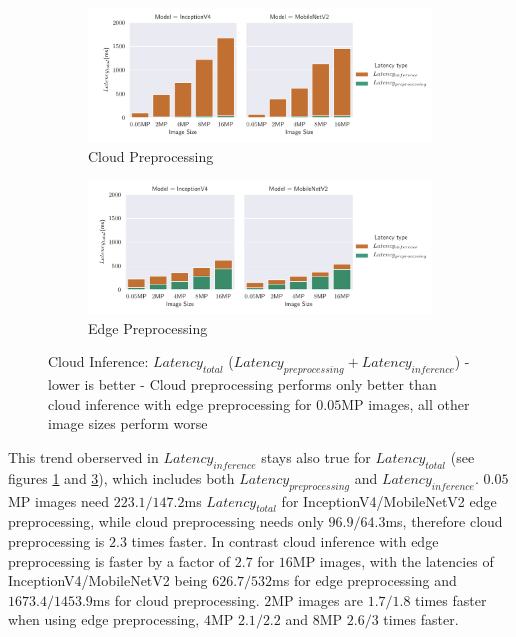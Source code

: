 \begin{figure}[!htb]
\centering
\begin{subfigure}[b]{0.95\textwidth}
   \includegraphics[width=1\linewidth]{./Bilder/single_plots/cloud_inference_plots/Cloud_Preprocessing_Inference_Comb_cloud_prepro.pdf}
   \caption{Cloud Preprocessing}
   \label{fig:CloudInference+PreproCloud} 
\end{subfigure}

\begin{subfigure}[b]{0.95\textwidth}
   \includegraphics[width=1\linewidth]{./Bilder/single_plots/cloud_inference_plots/Cloud_Preprocessing_Inference_Comb_edge_prepro.pdf}
   \caption{Edge Preprocessing}
   \label{fig:CloudInference+PreproEdge}
\end{subfigure}

\caption[Cloud Inference:  $Latency_{total}$  - lower is better]{Cloud Inference:  $Latency_{total}$ ($Latency_{preprocessing}+Latency_{inference}$) - lower is better - 
Cloud preprocessing performs only better than cloud inference with edge preprocessing for $0.05$MP images, all other image sizes perform worse}
\end{figure}

This trend oberserved in $Latency_{inference}$ stays also true for $Latency_{total}$ (see figures \ref{fig:CloudInference+PreproCloud} and \ref{fig:CloudInference+PreproEdge}), which includes both $Latency_{preprocessing}$ and $Latency_{inference}$. 
$0.05$MP images need $223.1/147.2$ms $Latency_{total}$ for InceptionV4/MobileNetV2 edge preprocessing, while cloud preprocessing needs only $96.9/64.3$ms, therefore cloud preprocessing is $2.3$ times faster.
In contrast cloud inference with edge preprocessing is faster by a factor of $2.7$ for $16$MP images, with the latencies of InceptionV4/MobileNetV2 being $626.7/532$ms for edge preprocessing and $1673.4/1453.9$ms for cloud preprocessing. $2$MP images are $1.7/1.8$ times faster when using edge preprocessing, $4$MP $2.1/2.2$ and $8$MP $2.6/3$ times faster.

